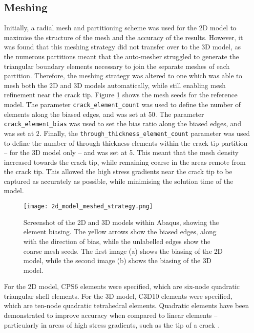 \subsection{Meshing}

Initially, a radial mesh and partitioning scheme was used for the 2D model to maximise the structure of the mesh and the accuracy of the results. However, it was found that this meshing strategy did not transfer over to the 3D model, as the numerous partitions meant that the auto-mesher struggled to generate the triangular boundary elements necessary to join the separate meshes of each partition. Therefore, the meshing strategy was altered to one which was able to mesh both the 2D and 3D models automatically, while still enabling mesh refinement near the crack tip. Figure \ref{fig:2d_fea_model_meshed_strategy} shows the mesh seeds for the reference model. The parameter \texttt{crack\_element\_count} was used to define the number of elements along the biased edges, and was set at 50. The parameter \texttt{crack\_element\_bias} was used to set the bias ratio along the biased edges, and was set at 2. Finally, the \texttt{through\_thickness\_element\_count} parameter was used to define the number of through-thickness elements within the crack tip partition -- for the 3D model only -- and was set at 5. This meant that the mesh density increased towards the crack tip, while remaining coarse in the areas remote from the crack tip. This allowed the high stress gradients near the crack tip to be captured as accurately as possible, while minimising the solution time of the model.

\begin{figure}[H]
	\centering
	\texttt{[image: 2d\_model\_meshed\_strategy.png]}
	\caption{Screenshot of the 2D and 3D models within Abaqus, showing the element biasing. The yellow arrows show the biased edges, along with the direction of bias, while the unlabelled edges show the coarse mesh seeds. The first image (a) shows the biasing of the 2D model, while the second image (b) shows the biasing of the 3D model.}
	\label{fig:2d_fea_model_meshed_strategy}
\end{figure}

For the 2D model, CPS6 elements were specified, which are six-node quadratic triangular shell elements. For the 3D model, C3D10 elements were specified, which are ten-node quadratic tetrahedral elements. Quadratic elements have been demonstrated to improve accuracy when compared to linear elements -- particularly in areas of high stress gradients, such as the tip of a crack \cite{kuna_finite_2013}.

